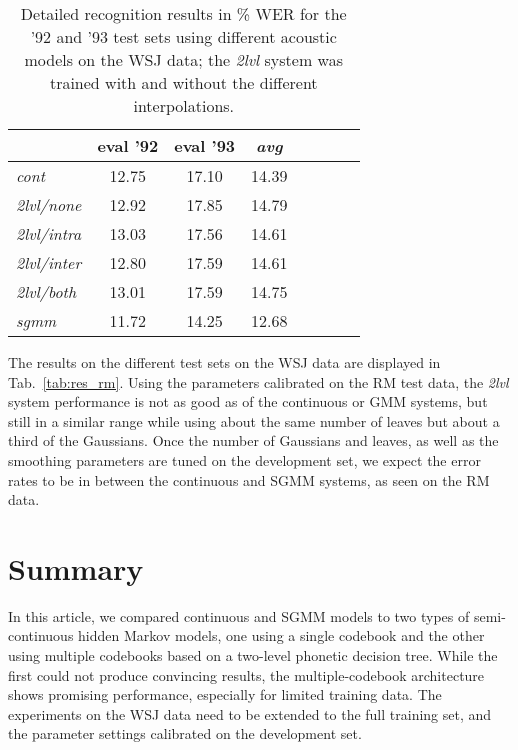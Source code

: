 \documentclass{article}
\begin{document}
\begin{table}%
\begin{center}
\begin{tabular}{|l||c|c|c|c|c|c||c|}
\hline
~                & eval '92 & eval '93 & {\em avg} \\ \hline\hline
{\em cont}       &    12.75 &    17.10 &     14.39 \\ \hline
{\em 2lvl/none}  &    12.92 &    17.85 &     14.79 \\ \hline
{\em 2lvl/intra} &    13.03 &    17.56 &     14.61 \\ \hline
{\em 2lvl/inter} &    12.80 &    17.59 &     14.61 \\ \hline
{\em 2lvl/both}  &    13.01 &    17.59 &     14.75 \\ \hline
{\em sgmm}       &    11.72 &    14.25 &     12.68 \\ \hline
\end{tabular}
\end{center}
\caption{\label{tab:res_wsj}
Detailed recognition results in \% WER for the '92 and '93 test sets using 
different acoustic models on the WSJ data; the {\em 2lvl} system was trained
with and without the different interpolations.
}
\end{table}

The results on the different test sets on the WSJ data are displayed in
Tab.~\ref{tab:res_rm}.
Using the parameters calibrated on the RM test data, the {\em 2lvl} system
performance is not as good as of the continuous or GMM systems, but still
in a similar range while using about the same number of leaves but about a
third of the Gaussians.
Once the number of Gaussians and leaves, as well as the smoothing parameters 
are tuned on the development set, we expect the error rates to be in between 
the continuous and SGMM systems, as seen on the RM data.

\section{Summary}
In this article, we compared continuous and SGMM models to 
two types of semi-continuous hidden Markov models, one using a single codebook 
and the other using multiple codebooks based on a two-level phonetic decision tree.
%
While the first could not produce convincing results, the multiple-codebook 
architecture shows promising performance, especially for limited training data. 
%
The experiments on the WSJ data need to be extended to the full training set, and
the parameter settings calibrated on the development set.
\end{document}
